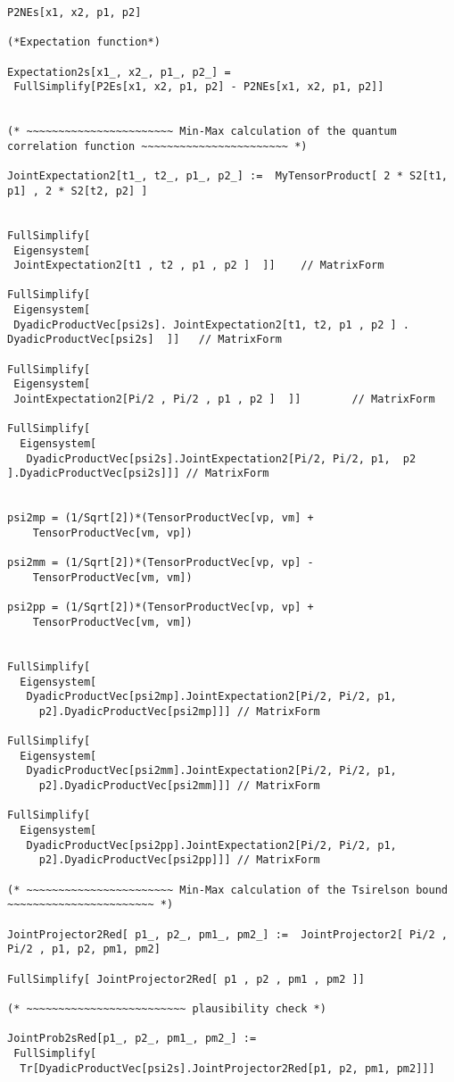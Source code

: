 \documentclass[%
  twocolumn,
 showpacs,
 showkeys,
 preprintnumbers,
 amsmath,amssymb,
 aps,
  pra,
  longbibliography,
 floatfix,
 ]{revtex4-1}
\begin{document}
{\begin{lstlisting}[backgroundcolor=\color{yellow!10},framerule=0pt,breaklines=true, frame=tb]
P2NEs[x1, x2, p1, p2]

(*Expectation function*)

Expectation2s[x1_, x2_, p1_, p2_] =
 FullSimplify[P2Es[x1, x2, p1, p2] - P2NEs[x1, x2, p1, p2]]


(* ~~~~~~~~~~~~~~~~~~~~~~~ Min-Max calculation of the quantum correlation function ~~~~~~~~~~~~~~~~~~~~~~~ *)

JointExpectation2[t1_, t2_, p1_, p2_] :=  MyTensorProduct[ 2 * S2[t1, p1] , 2 * S2[t2, p2] ]


FullSimplify[
 Eigensystem[
 JointExpectation2[t1 , t2 , p1 , p2 ]  ]]    // MatrixForm

FullSimplify[
 Eigensystem[
 DyadicProductVec[psi2s]. JointExpectation2[t1, t2, p1 , p2 ] . DyadicProductVec[psi2s]  ]]   // MatrixForm

FullSimplify[
 Eigensystem[
 JointExpectation2[Pi/2 , Pi/2 , p1 , p2 ]  ]]        // MatrixForm

FullSimplify[
  Eigensystem[
   DyadicProductVec[psi2s].JointExpectation2[Pi/2, Pi/2, p1,  p2 ].DyadicProductVec[psi2s]]] // MatrixForm


psi2mp = (1/Sqrt[2])*(TensorProductVec[vp, vm] +
    TensorProductVec[vm, vp])

psi2mm = (1/Sqrt[2])*(TensorProductVec[vp, vp] -
    TensorProductVec[vm, vm])

psi2pp = (1/Sqrt[2])*(TensorProductVec[vp, vp] +
    TensorProductVec[vm, vm])


FullSimplify[
  Eigensystem[
   DyadicProductVec[psi2mp].JointExpectation2[Pi/2, Pi/2, p1,
     p2].DyadicProductVec[psi2mp]]] // MatrixForm

FullSimplify[
  Eigensystem[
   DyadicProductVec[psi2mm].JointExpectation2[Pi/2, Pi/2, p1,
     p2].DyadicProductVec[psi2mm]]] // MatrixForm

FullSimplify[
  Eigensystem[
   DyadicProductVec[psi2pp].JointExpectation2[Pi/2, Pi/2, p1,
     p2].DyadicProductVec[psi2pp]]] // MatrixForm

(* ~~~~~~~~~~~~~~~~~~~~~~~ Min-Max calculation of the Tsirelson bound ~~~~~~~~~~~~~~~~~~~~~~~ *)

JointProjector2Red[ p1_, p2_, pm1_, pm2_] :=  JointProjector2[ Pi/2 , Pi/2 , p1, p2, pm1, pm2]

FullSimplify[ JointProjector2Red[ p1 , p2 , pm1 , pm2 ]]

(* ~~~~~~~~~~~~~~~~~~~~~~~~~ plausibility check *)

JointProb2sRed[p1_, p2_, pm1_, pm2_] :=
 FullSimplify[
  Tr[DyadicProductVec[psi2s].JointProjector2Red[p1, p2, pm1, pm2]]]


\end{lstlisting}}
\end{document}
